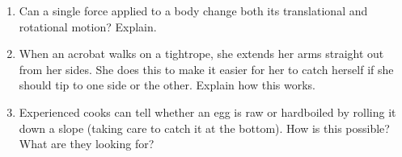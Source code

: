 \documentclass[]{beamer}
\begin{document}

\begin{frame}

\begin{enumerate}
\item Can a single force applied to a body change both its translational
and rotational motion? Explain.
\pause
\item When an acrobat walks on a tightrope, she extends her arms
straight out from her sides. She does this to make it easier for her
to catch herself if she should tip to one side or the other. Explain
how this works.
\pause

\item Experienced cooks can tell whether an egg is raw or hardboiled
by rolling it down a slope (taking care to catch it at the bottom).
How is this possible? What are they looking for?



\end{enumerate}
  
  \end{frame}







   



 


    
\end{document}
